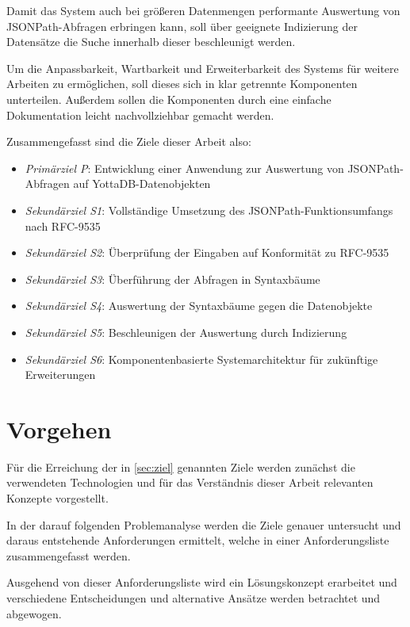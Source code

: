 \documentclass[oneside]{ausarbeitung}
\begin{document}
Damit das System auch bei größeren Datenmengen performante Auswertung von JSONPath-Abfragen erbringen kann, soll über geeignete Indizierung der Datensätze die Suche innerhalb dieser beschleunigt werden. 
	
Um die Anpassbarkeit, Wartbarkeit und Erweiterbarkeit des Systems für weitere Arbeiten zu ermöglichen, soll dieses sich in klar getrennte Komponenten unterteilen. Außerdem sollen die Komponenten durch eine einfache Dokumentation leicht nachvollziehbar gemacht werden.

Zusammengefasst sind die Ziele dieser Arbeit also:
	
\begin{itemize}
	\item \textit{Primärziel P}: Entwicklung einer Anwendung zur Auswertung von JSONPath-Abfragen auf YottaDB-Datenobjekten
	\item \textit{Sekundärziel S1}: Vollständige Umsetzung des JSONPath-Funktionsumfangs nach RFC-9535
	\item \textit{Sekundärziel S2}: Überprüfung der Eingaben auf Konformität zu RFC-9535 
	\item \textit{Sekundärziel S3}: Überführung der Abfragen in Syntaxbäume
	\item \textit{Sekundärziel S4}: Auswertung der Syntaxbäume gegen die Datenobjekte
	\item \textit{Sekundärziel S5}: Beschleunigen der Auswertung durch Indizierung
	\item \textit{Sekundärziel S6}: Komponentenbasierte Systemarchitektur für zukünftige Erweiterungen
\end{itemize}





\section{Vorgehen}
\label{sec:vorgehen}

Für die Erreichung der in \ref{sec:ziel} genannten Ziele werden zunächst die verwendeten Technologien und für das Verständnis dieser Arbeit relevanten Konzepte vorgestellt. 
	
In der darauf folgenden Problemanalyse werden die Ziele genauer untersucht und daraus entstehende Anforderungen ermittelt, welche in einer Anforderungsliste zusammengefasst werden.
	
Ausgehend von dieser Anforderungsliste wird ein Lösungskonzept erarbeitet und verschiedene Entscheidungen und alternative Ansätze werden betrachtet und abgewogen.
	
\end{document}
